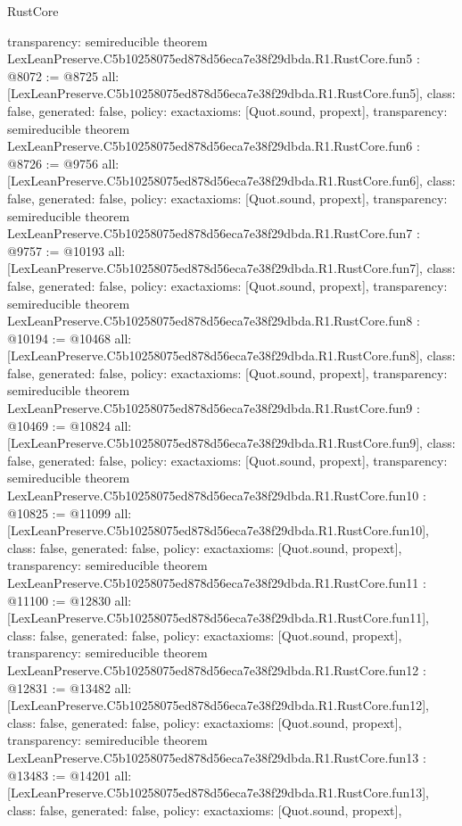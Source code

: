 \begin{lexlean}{RustCore}
\begin{coremodule}
{  transparency: semireducible
}
theorem LexLeanPreserve.C5b10258075ed878d56eca7e38f29dbda.R1.RustCore.fun5 : @8072 := @8725 {
  all: [LexLeanPreserve.C5b10258075ed878d56eca7e38f29dbda.R1.RustCore.fun5],
  class: false,
  generated: false,
  policy: exact{axioms: [Quot.sound, propext]},
  transparency: semireducible
}
theorem LexLeanPreserve.C5b10258075ed878d56eca7e38f29dbda.R1.RustCore.fun6 : @8726 := @9756 {
  all: [LexLeanPreserve.C5b10258075ed878d56eca7e38f29dbda.R1.RustCore.fun6],
  class: false,
  generated: false,
  policy: exact{axioms: [Quot.sound, propext]},
  transparency: semireducible
}
theorem LexLeanPreserve.C5b10258075ed878d56eca7e38f29dbda.R1.RustCore.fun7 : @9757 := @10193 {
  all: [LexLeanPreserve.C5b10258075ed878d56eca7e38f29dbda.R1.RustCore.fun7],
  class: false,
  generated: false,
  policy: exact{axioms: [Quot.sound, propext]},
  transparency: semireducible
}
theorem LexLeanPreserve.C5b10258075ed878d56eca7e38f29dbda.R1.RustCore.fun8 : @10194 := @10468 {
  all: [LexLeanPreserve.C5b10258075ed878d56eca7e38f29dbda.R1.RustCore.fun8],
  class: false,
  generated: false,
  policy: exact{axioms: [Quot.sound, propext]},
  transparency: semireducible
}
theorem LexLeanPreserve.C5b10258075ed878d56eca7e38f29dbda.R1.RustCore.fun9 : @10469 := @10824 {
  all: [LexLeanPreserve.C5b10258075ed878d56eca7e38f29dbda.R1.RustCore.fun9],
  class: false,
  generated: false,
  policy: exact{axioms: [Quot.sound, propext]},
  transparency: semireducible
}
theorem LexLeanPreserve.C5b10258075ed878d56eca7e38f29dbda.R1.RustCore.fun10 : @10825 := @11099 {
  all: [LexLeanPreserve.C5b10258075ed878d56eca7e38f29dbda.R1.RustCore.fun10],
  class: false,
  generated: false,
  policy: exact{axioms: [Quot.sound, propext]},
  transparency: semireducible
}
theorem LexLeanPreserve.C5b10258075ed878d56eca7e38f29dbda.R1.RustCore.fun11 : @11100 := @12830 {
  all: [LexLeanPreserve.C5b10258075ed878d56eca7e38f29dbda.R1.RustCore.fun11],
  class: false,
  generated: false,
  policy: exact{axioms: [Quot.sound, propext]},
  transparency: semireducible
}
theorem LexLeanPreserve.C5b10258075ed878d56eca7e38f29dbda.R1.RustCore.fun12 : @12831 := @13482 {
  all: [LexLeanPreserve.C5b10258075ed878d56eca7e38f29dbda.R1.RustCore.fun12],
  class: false,
  generated: false,
  policy: exact{axioms: [Quot.sound, propext]},
  transparency: semireducible
}
theorem LexLeanPreserve.C5b10258075ed878d56eca7e38f29dbda.R1.RustCore.fun13 : @13483 := @14201 {
  all: [LexLeanPreserve.C5b10258075ed878d56eca7e38f29dbda.R1.RustCore.fun13],
  class: false,
  generated: false,
  policy: exact{axioms: [Quot.sound, propext]},
}
\end{coremodule}
\end{lexlean}
